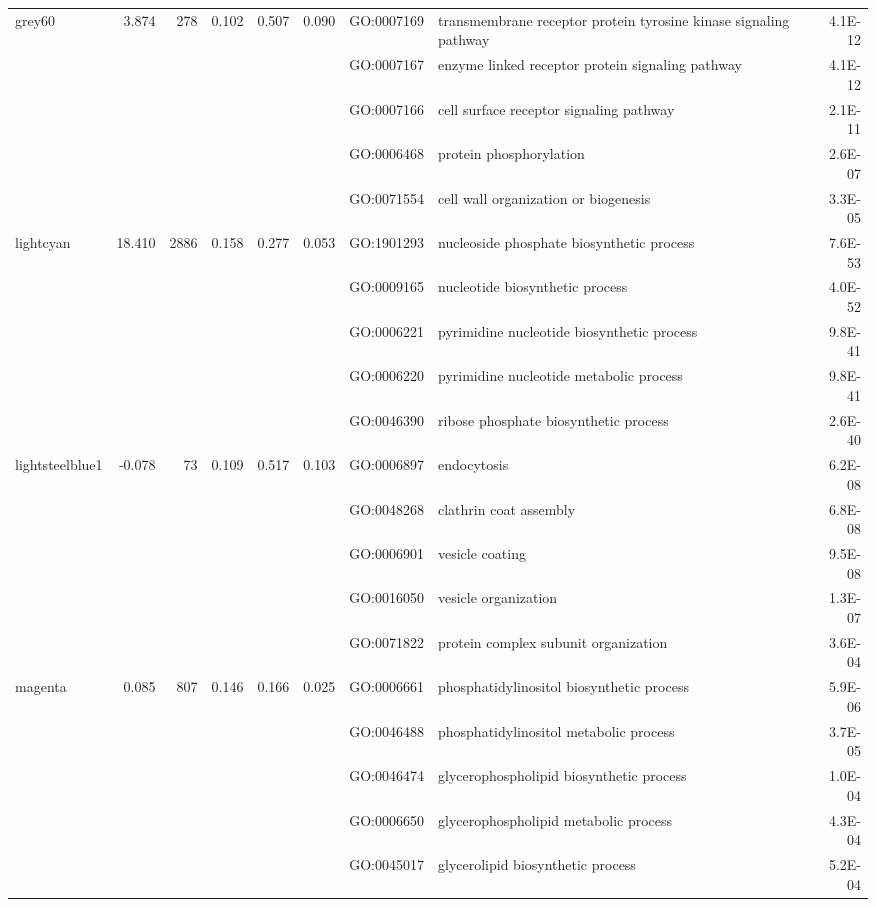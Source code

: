 \begin{landscape}
\begin{table}[ht]
\begin{tabular}{lrrrrrlP{5cm}r}
 grey60 & 3.874 & 278 & 0.102 & 0.507 & 0.090 & GO:0007169 & transmembrane receptor protein tyrosine kinase signaling pathway & 4.1E-12 \\ 
   &  &  &  &  &  & GO:0007167 & enzyme linked receptor protein signaling pathway & 4.1E-12 \\ 
   &  &  &  &  &  & GO:0007166 & cell surface receptor signaling pathway & 2.1E-11 \\ 
   &  &  &  &  &  & GO:0006468 & protein phosphorylation & 2.6E-07 \\ 
   &  &  &  &  &  & GO:0071554 & cell wall organization or biogenesis & 3.3E-05 \\ 
\hline 
 lightcyan & 18.410 & 2886 & 0.158 & 0.277 & 0.053 & GO:1901293 & nucleoside phosphate biosynthetic process & 7.6E-53 \\ 
   &  &  &  &  &  & GO:0009165 & nucleotide biosynthetic process & 4.0E-52 \\ 
   &  &  &  &  &  & GO:0006221 & pyrimidine nucleotide biosynthetic process & 9.8E-41 \\ 
   &  &  &  &  &  & GO:0006220 & pyrimidine nucleotide metabolic process & 9.8E-41 \\ 
   &  &  &  &  &  & GO:0046390 & ribose phosphate biosynthetic process & 2.6E-40 \\ 
\hline 
 lightsteelblue1 & -0.078 & 73 & 0.109 & 0.517 & 0.103 & GO:0006897 & endocytosis & 6.2E-08 \\ 
   &  &  &  &  &  & GO:0048268 & clathrin coat assembly & 6.8E-08 \\ 
   &  &  &  &  &  & GO:0006901 & vesicle coating & 9.5E-08 \\ 
   &  &  &  &  &  & GO:0016050 & vesicle organization & 1.3E-07 \\ 
   &  &  &  &  &  & GO:0071822 & protein complex subunit organization & 3.6E-04 \\ 
\hline 
 magenta & 0.085 & 807 & 0.146 & 0.166 & 0.025 & GO:0006661 & phosphatidylinositol biosynthetic process & 5.9E-06 \\ 
   &  &  &  &  &  & GO:0046488 & phosphatidylinositol metabolic process & 3.7E-05 \\ 
   &  &  &  &  &  & GO:0046474 & glycerophospholipid biosynthetic process & 1.0E-04 \\ 
   &  &  &  &  &  & GO:0006650 & glycerophospholipid metabolic process & 4.3E-04 \\ 
   &  &  &  &  &  & GO:0045017 & glycerolipid biosynthetic process & 5.2E-04 \\ 
\hline 
\end{tabular}
\end{table}



\end{landscape}
